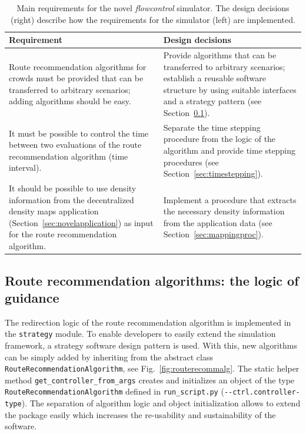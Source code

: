 \begin{table}[hbt!]
\begin{tabular}{|p{7cm}|p{7cm}|}
\hline
\textbf{Requirement} & \textbf{Design decisions}  \\
\hline 
Route recommendation algorithms for crowds must be provided that can be transferred to arbitrary scenarios; adding algorithms should be easy. & Provide algorithms that can be transferred to arbitrary scenarios; establish a reusable software structure by using suitable interfaces and a strategy pattern (see Section~\ref{sec:routerecommendationalgorithms}).  \\ \hline
 It must be possible to control the time between two evaluations of the route recommendation algorithm (time interval). & Separate the time stepping procedure from the logic of the algorithm and provide time stepping procedures (see Section~\ref{sec:timestepping}). \\ \hline
It should be possible to use density information from the decentralized density maps application (Section~\ref{sec:novelapplication}) as input for the route recommendation algorithm. & Implement a procedure that extracts the necessary density information from the application data (see Section~\ref{sec:mappingproc}).  \\
\hline
\end{tabular} 
\caption[Requirements on the novel flowcontrol simulator.]{Main requirements for the novel \textit{flowcontrol} simulator. The design decisions (right) describe how the requirements for the simulator (left) are implemented.  }
\label{tab:requirementsflowcontrol}
\end{table}




\FloatBarrier


\subsection{Route recommendation algorithms: the logic of guidance}
\label{sec:routerecommendationalgorithms}
The redirection logic of the route recommendation algorithm is implemented in the \lstinline{strategy} module. To enable developers to easily extend the simulation framework, a strategy software design pattern is used. With this, new algorithms can be simply added by inheriting from the abstract class \lstinline{RouteRecommendationAlgorithm}, see Fig.~\ref{fig:routerecommalg}. 
The static helper method \lstinline{get_controller_from_args} creates and initializes an object of the type \lstinline{RouteRecommendationAlgorithm} defined in \lstinline{run_script.py} (\lstinline{--ctrl.controller-type}). The separation of algorithm logic and object initialization allows to extend the package easily which increases the re-usability and sustainability of the software. 


